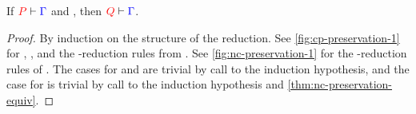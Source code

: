 \begin{theorem}[Preservation]\label{thm:nc-preservation}
  If $\seq[{ P }]{ \Gamma }$ and ,
  then $\seq[{ Q }]{ \Gamma }$.
\end{theorem}
\begin{proof}
  By induction on the structure of the reduction.
  See \cref{fig:cp-preservation-1} for , , and the
  \textbeta-reduction rules from \cp.
  See \cref{fig:nc-preservation-1} for the \textbeta-reduction rules of \nodcap.
  The cases for \cpRedGammaCut and \ncRedGammaPool are trivial by call to the
  induction hypothesis, and the case for \cpRedGammaEquiv is trivial by call to
  the induction hypothesis and \cref{thm:nc-preservation-equiv}.
\end{proof}

